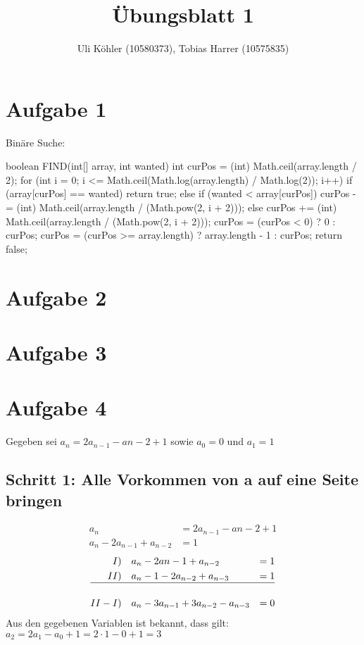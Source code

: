 \documentclass[a4paper,10pt,freqn]{article}
\title{Übungsblatt 1}
\author{Uli Köhler (10580373), Tobias Harrer (10575835)}
\begin{document}
\maketitle

\section{Aufgabe 1}
Binäre Suche:\newline

boolean FIND(int[] array, int wanted) {
        int curPos = (int) Math.ceil(array.length / 2);
        for (int i = 0; i <= Math.ceil(Math.log(array.length) / Math.log(2)); i++) {
            if (array[curPos] == wanted) {
                return true;
            } else if (wanted < array[curPos]) {
                curPos -= (int) Math.ceil(array.length / (Math.pow(2, i + 2)));
            } else {
                curPos += (int) Math.ceil(array.length / (Math.pow(2, i + 2)));
            }
            curPos = (curPos < 0) ? 0 : curPos;
            curPos = (curPos >= array.length) ? array.length - 1 : curPos;
        }
        return false;
    }

\section{Aufgabe 2}

\section{Aufgabe 3}

\section{Aufgabe 4}
Gegeben sei $a_n = 2a_{n-1}-a{n-2} + 1$
sowie $a_0 = 0$ und $a_1 = 1$\\
\subsection{Schritt 1: Alle Vorkommen von a auf eine Seite bringen}
\begin{align*}
a_n &= 2a_{n-1}-a{n-2}+1 \\
a_n-2a_{n-1}+a_{n-2}&=1
\end{align*}
\begin{align*}
I)\quad&a_n-2a{n-1}+a_{n-2}&=1\\
II)\quad&a_n-1-2a_{n-2}+a_{n-3}&=1\\
\hline\\
II-I)\quad&a_n-3a_{n-1}+3a_{n-2}-a_{n-3}&=0\label{(1)-(2)}
\end{align*}
Aus den gegebenen Variablen ist bekannt, dass gilt:\\$a_2 = 2a_1-a_0+1 = 2\cdot1-0+1=3$\\
\end{document}

